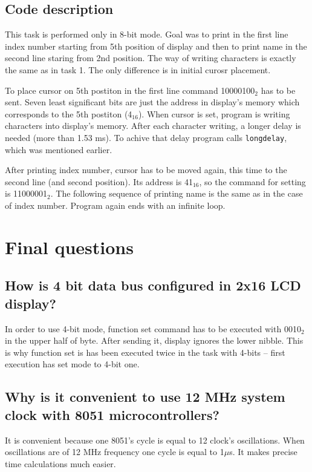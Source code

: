 \documentclass{article}
\begin{document}
\subsection{Code description}
This task is performed only in 8-bit mode. Goal was to print in the first line index number
starting from 5th position of display and then to print name in the second line staring from 2nd
position. The way of writing characters is exactly the same as in task 1. The only difference is
in initial curosr placement.

To place cursor on 5th postiton in the first line command 10000100$_2$ has to be sent.
Seven least significant bits are just the address in display's memory which corresponds
to the 5th postiton (4$_{16}$). When cursor is set, program is writing characters into display's
memory. After each character writing, a longer delay is needed (more than 1.53 ms). To achive
that delay program calls \texttt{long\textunderscore delay}, which was mentioned earlier.

After printing index number, cursor has to be moved again, this time to the second line (and second position).
Its address is 41$_{16}$, so the command for setting is 11000001$_2$. The following sequence
of printing name is the same as in the case of index number. Program again ends with an infinite loop.

\section{Final questions}
\subsection*{How is 4 bit data bus configured in 2x16 LCD display?}
In order to use 4-bit mode, function set command has to be executed with 0010$_2$ in the
upper half of byte. After sending it, display ignores the lower nibble. This is why function
set is has been executed twice in the task with 4-bits -- first execution has set mode to 4-bit one.

\subsection*{Why is it convenient to use 12 MHz system clock with 8051 microcontrollers?}
It is convenient because one 8051's cycle is equal to 12 clock's oscillations. When
oscillations are of 12 MHz frequency one cycle is equal to 1$\mu$s. It makes precise
time calculations much easier.
\end{document}
